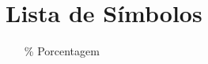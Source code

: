 \chapter*{Lista de Símbolos}
\thispagestyle{empty} %

\begin{itemize}
	
    
    \item[ \% ] \qquad Porcentagem
\end{itemize}